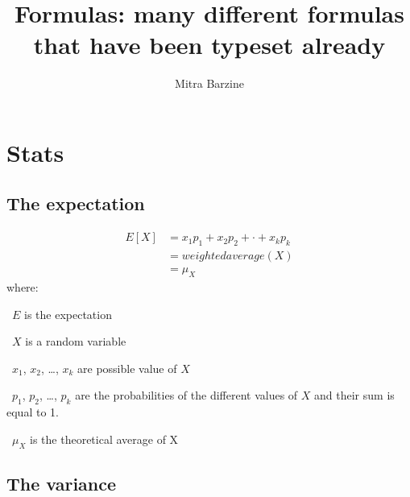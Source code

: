 \documentclass[a4paper, headinclude, footinclude, BCOR=1cm]{scrbook}
\begin{document}
\title{Formulas: many different formulas that have been typeset already}
\author{Mitra Barzine}
\maketitle

\begin{comment}

\begin{equation}
  \tag{}
\end{equation}
where:
\quad\begin{eqlist}
    \item[\textbullet\ ]
\end{eqlist}

\end{comment}

\chapter{Stats}
\section{The expectation}
\begin{equation}\label{eq:expectation}
    \tag{Expectation}
    \begin{split}
E[X] & = x_1p_1 + x_2p_2+ \cdot +x_kp_k \\
     & = weighted average(X) \\
     & = \mu_X
 \end{split}
\end{equation}
where:%
\quad\begin{eqlist}
    \item[\textbullet\ $E$] is the expectation
    \item[\textbullet\ $X$] is a random variable
    \item[\textbullet\ $x_1$, $x_2$, \ldots, $x_k$] are possible value of $X$
    \item[\textbullet\ $p_1$, $p_2$, \ldots, $p_k$] are the probabilities of the different
        values of $X$ and their sum is equal to 1.
    \item[\textbullet\ $\mu_X$] is the theoretical average of X
\end{eqlist}


\section{The variance}
\end{document}
